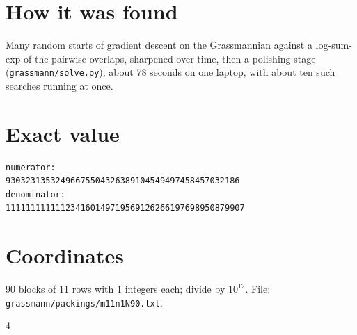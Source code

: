 \documentclass[11pt,a4paper]{article}
\begin{document}
\section{How it was found}
Many random starts of gradient descent on the Grassmannian against a log-sum-exp of the pairwise overlaps, sharpened over time, then a polishing stage (\texttt{grassmann/solve.py}); about 78 seconds on one laptop, with about ten such searches running at once.


\appendix
\section{Exact value}
{\small
\begin{verbatim}
numerator:
93032313532496675504326389104549497458457032186
denominator:
111111111111234160149719569126266197698950879907
\end{verbatim}}

\section{Coordinates}
90 blocks of 11 rows with 1 integers each; divide by $10^{12}$. File: \texttt{grassmann/packings/m11n1N90.txt}.
{\tiny
\begin{multicols}{4}
\end{multicols}}
\end{document}

